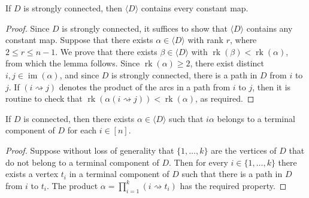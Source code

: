 \documentclass[ALCO,ThmDefs,Unicode,epreuves]{cedram}
\DeclareMathOperator{\im}{im}
\DeclareMathOperator{\rk}{rk}
\newcommand{\genset}[1]{\langle#1\rangle}
\newcommand{\nset}{[n]}
\begin{document}
\begin{lemma}\label{lem:terminal1}
 If $D$ is strongly connected, then $\genset{D}$ contains every constant map.
\end{lemma}
\begin{proof} 
 Since $D$ is strongly connected, it suffices to show that $\genset{D}$
 contains any constant map. Suppose that there exists $\alpha\in \genset{D}$
 with rank $r$, where $2\leq r \leq n - 1$. We prove that there exists
 $\beta\in \genset{D}$ with $\rk(\beta) < \rk(\alpha)$, from which the lemma
 follows. Since $\rk(\alpha) \geq 2$, there exist distinct $i, j\in
 \im(\alpha)$, and since $D$ is strongly connected, there is a path in $D$
 from $i$ to $j$. If $(i\rightsquigarrow j)$ denotes the product of the arcs
 in a path from $i$ to $j$, then it is routine to check
 that $\rk(\alpha (i\rightsquigarrow j)) < \rk(\alpha)$, as required.
\end{proof}

\begin{lemma}\label{lem:terminal2}
 If $D$ is connected, then there exists $\alpha\in\genset{D}$ such that
 $i\alpha$ belongs to a terminal component of $D$ for each $i\in\nset$.
\end{lemma}
\begin{proof}
 Suppose without loss of generality that $\{1, \ldots, k\}$ are the vertices
 of $D$ that do not belong to a terminal component of $D$. Then for every
 $i\in \{1, \ldots, k\}$ there exists a vertex $t_i$ in a terminal component
 of $D$ such that there is a path in $D$ from $i$ to $t_i$. 
 The product $\alpha = \prod_{i = 1}^{k} (i \rightsquigarrow t_i)$
 has the required property.
\end{proof}
\end{document}
